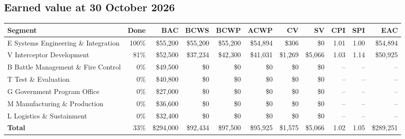 \documentclass[12pt,letterpaper,oneside]{article}
\newcommand{\figfont}{\fontsize{9}{11}\selectfont}   %
\begin{document}
\subsection{Earned value at 30 October 2026}
{\figfont\setlength{\tabcolsep}{3pt}
\begin{tabular}{@{}l r r r r r r r r r r@{}}
\toprule
Segment & Done & BAC & BCWS & BCWP & ACWP & CV & SV & CPI & SPI & EAC \\
\midrule
E Systems Engineering \& Integration & 100\% & \$55,200 & \$55,200 & \$55,200 & \$54,894 & \$306 & \$0 & 1.01 & 1.00 & \$54,894 \\
V Interceptor Development & 81\% & \$52,500 & \$37,234 & \$42,300 & \$41,031 & \$1,269 & \$5,066 & 1.03 & 1.14 & \$50,925 \\
B Battle Management \& Fire Control & 0\% & \$49,500 & \$0 & \$0 & \$0 & \$0 & \$0 & -- & -- & -- \\
T Test \& Evaluation & 0\% & \$40,800 & \$0 & \$0 & \$0 & \$0 & \$0 & -- & -- & -- \\
G Government Program Office & 0\% & \$27,000 & \$0 & \$0 & \$0 & \$0 & \$0 & -- & -- & -- \\
M Manufacturing \& Production & 0\% & \$36,600 & \$0 & \$0 & \$0 & \$0 & \$0 & -- & -- & -- \\
L Logistics \& Sustainment & 0\% & \$32,400 & \$0 & \$0 & \$0 & \$0 & \$0 & -- & -- & -- \\
\midrule
\textbf{Total} & 33\% & \$294,000 & \$92,434 & \$97,500 & \$95,925 & \$1,575 & \$5,066 & 1.02 & 1.05 & \$289,251 \\
\bottomrule
\end{tabular}}
\end{document}
